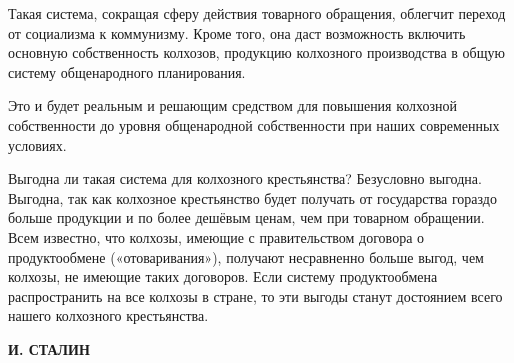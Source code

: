 \documentclass[12pt, a4paper, openany]{book}
\begin{document}
Такая система, сокращая сферу действия товарного обращения, облегчит переход от социализма к коммунизму. Кроме того, она даст возможность включить основную собственность колхозов, продукцию колхозного производства в общую систему общенародного планирования.

Это и будет реальным и решающим средством для повышения колхозной собственности до уровня общенародной собственности при наших современных условиях.

Выгодна ли такая система для колхозного крестьянства? Безусловно выгодна. Выгодна, так как колхозное крестьянство будет получать от государства гораздо больше продукции и по более дешёвым ценам, чем при товарном обращении. Всем известно, что колхозы, имеющие с правительством договора о продуктообмене («отоваривания»), получают несравненно больше выгод, чем колхозы, не имеющие таких договоров. Если систему продуктообмена распространить на все колхозы в стране, то эти выгоды станут достоянием всего нашего колхозного крестьянства.

\begin{flushright}



\textbf{И. СТАЛИН}



\end{flushright}










\newpage



\tableofcontents



\thispagestyle{empty} %





\newpage



\setcounter{secnumdepth}{0}



\end{document}

